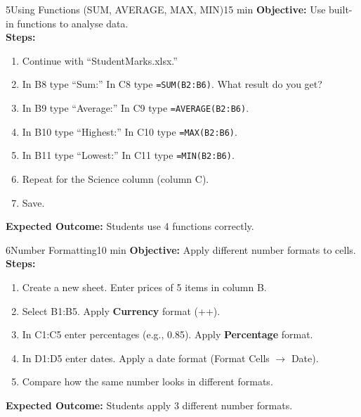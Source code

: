 \begin{labactivity}{5}{Using Functions (SUM, AVERAGE, MAX, MIN)}{15 min}
\textbf{Objective:} Use built-in functions to analyse data.\\[4pt]
\textbf{Steps:}
\begin{enumerate}[label=\protect\stepcircle{\arabic*}, leftmargin=2cm, itemsep=4pt]
  \item Continue with ``StudentMarks.xlsx.''
  \item In B8 type ``Sum:'' In C8 type \texttt{=SUM(B2:B6)}. What result do you get?
  \item In B9 type ``Average:'' In C9 type \texttt{=AVERAGE(B2:B6)}.
  \item In B10 type ``Highest:'' In C10 type \texttt{=MAX(B2:B6)}.
  \item In B11 type ``Lowest:'' In C11 type \texttt{=MIN(B2:B6)}.
  \item Repeat for the Science column (column C).
  \item Save.
\end{enumerate}
\textbf{Expected Outcome:} Students use 4 functions correctly.
\welldone
\end{labactivity}

\begin{labactivity}{6}{Number Formatting}{10 min}
\textbf{Objective:} Apply different number formats to cells.\\[4pt]
\textbf{Steps:}
\begin{enumerate}[label=\protect\stepcircle{\arabic*}, leftmargin=2cm, itemsep=4pt]
  \item Create a new sheet. Enter prices of 5 items in column B.
  \item Select B1:B5. Apply \textbf{Currency} format (++\key{\$}).
  \item In C1:C5 enter percentages (e.g., 0.85). Apply \textbf{Percentage} format.
  \item In D1:D5 enter dates. Apply a date format (Format Cells $\rightarrow$ Date).
  \item Compare how the same number looks in different formats.
\end{enumerate}
\textbf{Expected Outcome:} Students apply 3 different number formats.
\welldone
\end{labactivity}

